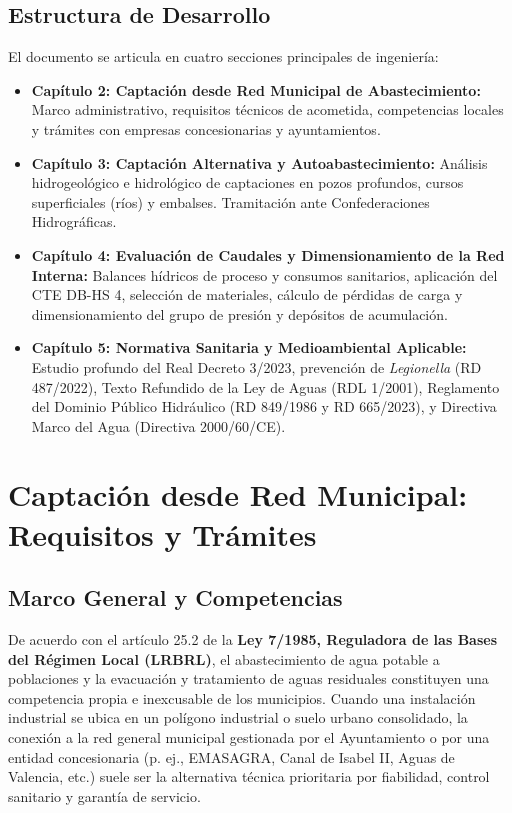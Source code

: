 \documentclass{report}
\begin{document}
\section{Estructura de Desarrollo}
El documento se articula en cuatro secciones principales de ingeniería:
\begin{itemize}
    \item \textbf{Capítulo 2: Captación desde Red Municipal de Abastecimiento:} Marco administrativo, requisitos técnicos de acometida, competencias locales y trámites con empresas concesionarias y ayuntamientos.
    \item \textbf{Capítulo 3: Captación Alternativa y Autoabastecimiento:} Análisis hidrogeológico e hidrológico de captaciones en pozos profundos, cursos superficiales (ríos) y embalses. Tramitación ante Confederaciones Hidrográficas.
    \item \textbf{Capítulo 4: Evaluación de Caudales y Dimensionamiento de la Red Interna:} Balances hídricos de proceso y consumos sanitarios, aplicación del CTE DB-HS 4, selección de materiales, cálculo de pérdidas de carga y dimensionamiento del grupo de presión y depósitos de acumulación.
    \item \textbf{Capítulo 5: Normativa Sanitaria y Medioambiental Aplicable:} Estudio profundo del Real Decreto 3/2023, prevención de \textit{Legionella} (RD 487/2022), Texto Refundido de la Ley de Aguas (RDL 1/2001), Reglamento del Dominio Público Hidráulico (RD 849/1986 y RD 665/2023), y Directiva Marco del Agua (Directiva 2000/60/CE).
\end{itemize}

\chapter{Captación desde Red Municipal: Requisitos y Trámites}

\section{Marco General y Competencias}
De acuerdo con el artículo 25.2 de la \textbf{Ley 7/1985, Reguladora de las Bases del Régimen Local (LRBRL)}, el abastecimiento de agua potable a poblaciones y la evacuación y tratamiento de aguas residuales constituyen una competencia propia e inexcusable de los municipios. Cuando una instalación industrial se ubica en un polígono industrial o suelo urbano consolidado, la conexión a la red general municipal gestionada por el Ayuntamiento o por una entidad concesionaria (p. ej., EMASAGRA, Canal de Isabel II, Aguas de Valencia, etc.) suele ser la alternativa técnica prioritaria por fiabilidad, control sanitario y garantía de servicio.
\end{document}
